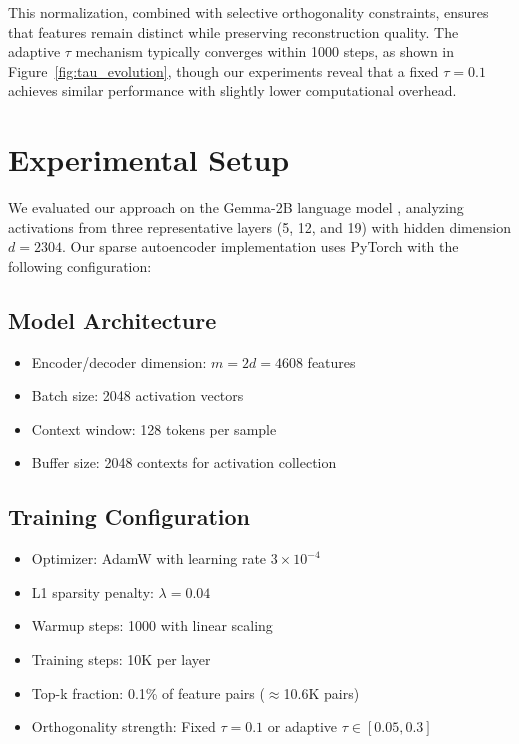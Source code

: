 \documentclass{article} %
\begin{document}
This normalization, combined with selective orthogonality constraints, ensures that features remain distinct while preserving reconstruction quality. The adaptive $\tau$ mechanism typically converges within 1000 steps, as shown in Figure~\ref{fig:tau_evolution}, though our experiments reveal that a fixed $\tau=0.1$ achieves similar performance with slightly lower computational overhead.

\section{Experimental Setup}
\label{sec:experimental}

We evaluated our approach on the Gemma-2B language model \cite{gpt4}, analyzing activations from three representative layers (5, 12, and 19) with hidden dimension $d=2304$. Our sparse autoencoder implementation uses PyTorch \cite{paszke2019pytorch} with the following configuration:

\subsection{Model Architecture}
\begin{itemize}
    \item Encoder/decoder dimension: $m=2d=4608$ features
    \item Batch size: 2048 activation vectors
    \item Context window: 128 tokens per sample
    \item Buffer size: 2048 contexts for activation collection
\end{itemize}

\subsection{Training Configuration}
\begin{itemize}
    \item Optimizer: AdamW \cite{loshchilov2017adamw} with learning rate $3\times10^{-4}$
    \item L1 sparsity penalty: $\lambda=0.04$
    \item Warmup steps: 1000 with linear scaling
    \item Training steps: 10K per layer
    \item Top-k fraction: 0.1\% of feature pairs ($\approx$10.6K pairs)
    \item Orthogonality strength: Fixed $\tau=0.1$ or adaptive $\tau\in[0.05,0.3]$
\end{itemize}
\end{document}
